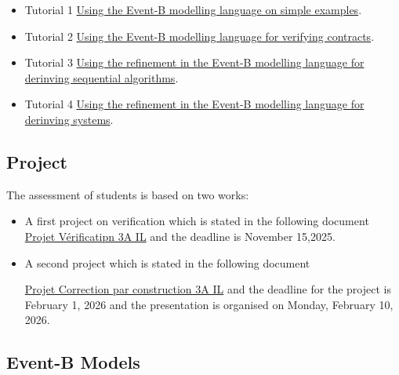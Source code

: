 \documentclass[ 12pt]{article}
\begin{document}
  \begin{itemize}
  \item[]   Tutorial 1
    \href{http://mery54.github.io/teaching/mosos/lecturesnotes/mcfsi-td1.pdf}{Using
      the Event-B modelling language on simple examples}.

   \item[]   Tutorial 2
    \href{http://mery54.github.io/teaching/mosos/lecturesnotes/mcfsi-td2.pdf}{Using
      the Event-B modelling language  for verifying contracts}.



    \item[]   Tutorial 3
    \href{http://mery54.github.io/teaching/mosos/lecturesnotes/mcfsi-td3.pdf}{Using
      the refinement in 
      the Event-B modelling language  for derinving sequential algorithms}.


    
    \item[]   Tutorial 4
    \href{http://mery54.github.io/teaching/mosos/lecturesnotes/mcfsi-td4.pdf}{Using
      the refinement in 
      the Event-B modelling language  for derinving  systems}.


  \end{itemize}

  
  \subsection{Project}
\label{sec:project}

The assessment  of students is based on two works:
\begin{itemize}
\item A first project  on verification  which is stated  in the following
  document  \href{http://mery54.github.io/teaching/mosos/lecturesnotes/project-verification2025.pdf}{Projet
    Vérificatipn    3A IL}  and the deadline is November 15,2025. 
\item A second project which is stated in the following document
  
  \href{http://mery54.github.io/teaching/mosos/lecturesnotes/telecom-projects2526.pdf}{Projet
    Correction par construction 
    3A IL}   and the deadline for the project is  February 1, 2026 and the presentation 
is organised on Monday, February 10, 2026. 
\end{itemize}



  \subsection{Event-B Models}
\label{sec:event-b-models}
\end{document}

